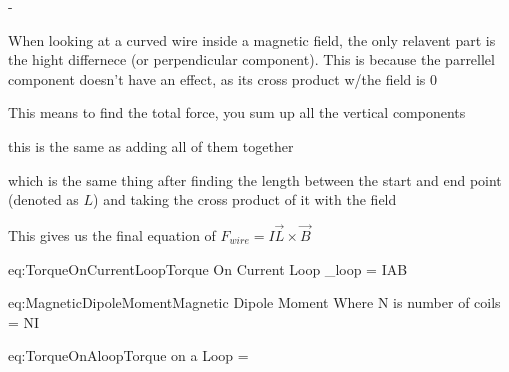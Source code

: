 \begin{example}
\begin{center}
        \begin{list}{-}{}
        \item When looking at a curved wire inside a magnetic field, the only relavent part is the hight differnece (or perpendicular component). This is because the parrellel component doesn't have an effect, as its cross product w/the field is 0   
        \item This means to find the total force, you sum up all the vertical components
        \item this is the same as adding all of them together 
        \item which is the same thing after finding the length between the start and end point (denoted as \(L\)) and taking the cross product of it with the field 
        \item This gives us the final equation of \(F_{wire} = I\vec{L}\times \vec{B}\)
        \end{list}
    \end{center}
\end{example}

\begin{eqboxed}{eq:TorqueOnCurrentLoop}{Torque On Current Loop}
{}
\tau_{loop} = IAB\sin\theta
\end{eqboxed}

\begin{eqboxed}{eq:MagneticDipoleMoment}{Magnetic Dipole Moment}
{Where N is number of coils}
\mu = NI
\end{eqboxed}
\begin{eqboxed}{eq:TorqueOnAloop}{Torque on a Loop}
{}
\vec{\tau} = \vec{\mu} \times {}
\end{eqboxed}

